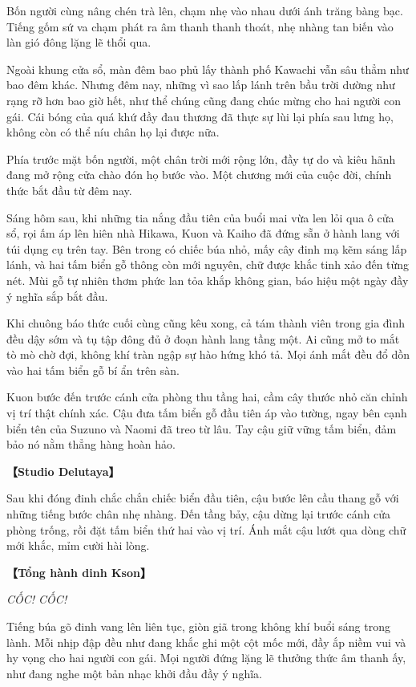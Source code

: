 ﻿\documentclass[../main.tex]{subfiles}
\begin{document}
Bốn người cùng nâng chén trà lên, chạm nhẹ vào nhau dưới ánh trăng bàng bạc. Tiếng gốm sứ va chạm phát ra âm thanh thanh thoát, nhẹ nhàng tan biến vào làn gió đông lặng lẽ thổi qua.

Ngoài khung cửa sổ, màn đêm bao phủ lấy thành phố Kawachi vẫn sâu thẳm như bao đêm khác. Nhưng đêm nay, những vì sao lấp lánh trên bầu trời dường như rạng rỡ hơn bao giờ hết, như thể chúng cũng đang chúc mừng cho hai người con gái. Cái bóng của quá khứ đầy đau thương đã thực sự lùi lại phía sau lưng họ, không còn có thể níu chân họ lại được nữa.

Phía trước mặt bốn người, một chân trời mới rộng lớn, đầy tự do và kiêu hãnh đang mở rộng cửa chào đón họ bước vào. Một chương mới của cuộc đời, chính thức bắt đầu từ đêm nay.

\omk

Sáng hôm sau, khi những tia nắng đầu tiên của buổi mai vừa len lỏi qua ô cửa sổ, rọi ấm áp lên hiên nhà Hikawa, Kuon và Kaiho đã đứng sẵn ở hành lang với túi dụng cụ trên tay. Bên trong có chiếc búa nhỏ, mấy cây đinh mạ kẽm sáng lấp lánh, và hai tấm biển gỗ thông còn mới nguyên, chữ được khắc tinh xảo đến từng nét. Mùi gỗ tự nhiên thơm phức lan tỏa khắp không gian, báo hiệu một ngày đầy ý nghĩa sắp bắt đầu.

Khi chuông báo thức cuối cùng cũng kêu xong, cả tám thành viên trong gia đình đều dậy sớm và tụ tập đông đủ ở đoạn hành lang tầng một. Ai cũng mở to mắt tò mò chờ đợi, không khí tràn ngập sự hào hứng khó tả. Mọi ánh mắt đều đổ dồn vào hai tấm biển gỗ bí ẩn trên sàn.

Kuon bước đến trước cánh cửa phòng thu tầng hai, cầm cây thước nhỏ căn chỉnh vị trí thật chính xác. Cậu đưa tấm biển gỗ đầu tiên áp vào tường, ngay bên cạnh biển tên của Suzuno và Naomi đã treo từ lâu. Tay cậu giữ vững tấm biển, đảm bảo nó nằm thẳng hàng hoàn hảo.

\textbf{【Studio Delutaya】}

Sau khi đóng đinh chắc chắn chiếc biển đầu tiên, cậu bước lên cầu thang gỗ với những tiếng bước chân nhẹ nhàng. Đến tầng bảy, cậu dừng lại trước cánh cửa phòng trống, rồi đặt tấm biển thứ hai vào vị trí. Ánh mắt cậu lướt qua dòng chữ mới khắc, mỉm cười hài lòng.

\textbf{【Tổng hành dinh Kson】}

\textit{CỐC! CỐC!}

Tiếng búa gõ đinh vang lên liên tục, giòn giã trong không khí buổi sáng trong lành. Mỗi nhịp đập đều như đang khắc ghi một cột mốc mới, đầy ắp niềm vui và hy vọng cho hai người con gái. Mọi người đứng lặng lẽ thưởng thức âm thanh ấy, như đang nghe một bản nhạc khởi đầu đầy ý nghĩa.
\end{document}

